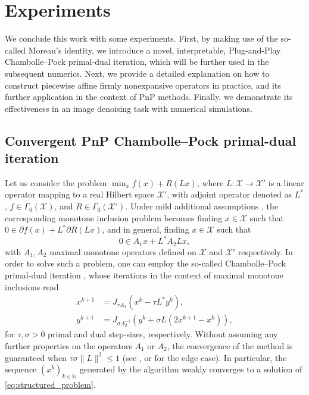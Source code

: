\documentclass[onefignum,onetabnum]{siamonline250211}
\newcommand{\cX}{\mathcal{X}}
\begin{document}
\section{Experiments}\label{exps}
We conclude this work with some experiments. First, by making use of the so-called Moreau's identity, we introduce a novel, interpretable, Plug-and-Play Chambolle--Pock primal-dual iteration, which will be further used in the subsequent numerics. Next, we provide a detailed explanation on how to construct piecewise affine firmly nonexpansive operators in practice, and its further application in the context of PnP methods. Finally, we demonstrate its effectiveness in an image denoising task with numerical simulations.

\subsection{Convergent PnP Chambolle--Pock primal-dual iteration}\label{sec:pnpcp}
Let us consider the problem $\min_x f(x)+R(Lx)$, where $L:\cX\to\cX'$ is a linear operator mapping to a real Hilbert space $\cX'$, with adjoint operator denoted as $L^*$, $f\in \Gamma_0(\cX)$, and $R\in \Gamma_0(\cX')$. Under mild additional assumptions \cite[Theorem 16.47]{BCombettes}, the corresponding monotone inclusion problem becomes finding $x\in\cX$ such that $0\in \partial f (x) + L^* \partial R(Lx)$, and in general, finding $x\in\cX$ such that 
\begin{equation}\label{eq:structured_problem}
    0\in A_1x + L^* A_2 Lx,
\end{equation}
with $A_1, A_2$ maximal monotone operators defined on $\cX$ and $\cX'$ respectively. In order to solve such a problem, one can employ the so-called Chambolle--Pock primal-dual iteration \cite{Chambolle2011}, whose iterations in the context of maximal monotone inclusions read
\begin{equation*}
    \begin{aligned}
    x^{k+1} & = J_{\tau A_1}( x^k-\tau L^* y^{k}),\\
    y^{k+1} & = J_{\sigma A_2^{-1}}\left(y^k + \sigma L(2x^{k+1}-x^k)\right),
    \end{aligned}
\end{equation*}
for $\tau, \sigma >0$ primal and dual step-sizes, respectively. Without assuming any further properties on the operators $A_1$ or $A_2$, the convergence of the method is guaranteed when $\tau \sigma \|L\|^2\leq 1$ (see \cite{Chambolle2011}, or \cite{bredies2021degenerate} for the edge case). In particular, the sequence $(x^k)_{k\in \mathbb{N}}$ generated by the algorithm weakly converges to a solution of \cref{eq:structured_problem}. 
\end{document}
